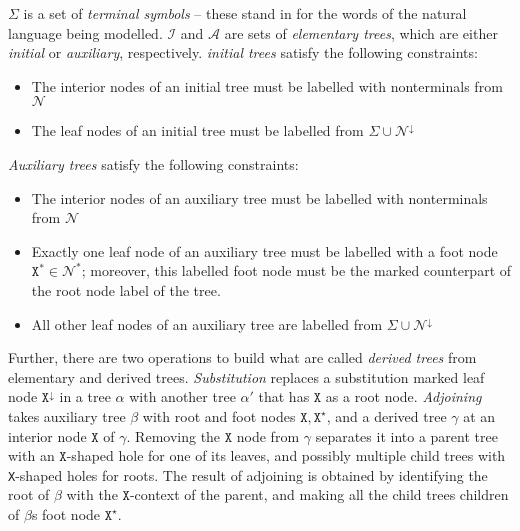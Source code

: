 $\Sigma$ is a set of \emph{terminal symbols} -- these stand in for the words of the natural language being modelled. $\mathcal{I}$ and $\mathcal{A}$ are sets of \emph{elementary trees}, which are either \emph{initial} or \emph{auxiliary}, respectively. \emph{initial trees} satisfy the following constraints:

	\begin{itemize}
		\item{The interior nodes of an initial tree must be labelled with nonterminals from $\mathcal{N}$}
		\item{The leaf nodes of an initial tree must be labelled from $\Sigma \cup \mathcal{N}^{\downarrow}$}
	\end{itemize}
\emph{Auxiliary trees} satisfy the following constraints:
	\begin{itemize}
		\item{The interior nodes of an auxiliary tree must be labelled with nonterminals from $\mathcal{N}$}
		\item{Exactly one leaf node of an auxiliary tree must be labelled with a foot node $\texttt{X}^{*} \in \mathcal{N}^{*}$; moreover, this labelled foot node must be the marked counterpart of the root node label of the tree.}
		\item{All other leaf nodes of an auxiliary tree are labelled from $\Sigma \cup \mathcal{N}^{\downarrow}$}
	\end{itemize}

Further, there are two operations to build what are called \emph{derived trees} from elementary and derived trees. \emph{Substitution} replaces a substitution marked leaf node $\texttt{X}^\downarrow$ in a tree $\alpha$ with another tree $\alpha'$ that has $\texttt{X}$ as a root node. \emph{Adjoining} takes auxiliary tree $\beta$ with root and foot nodes $\texttt{X},\texttt{X}^\star$, and a derived tree $\gamma$ at an interior node $\texttt{X}$ of $\gamma$. Removing the $\texttt{X}$ node from $\gamma$ separates it into a parent tree with an $\texttt{X}$-shaped hole for one of its leaves, and possibly multiple child trees with \texttt{X}-shaped holes for roots. The result of adjoining is obtained by identifying the root of $\beta$ with the $\texttt{X}$-context of the parent, and making all the child trees children of $\beta$s foot node $\texttt{X}^\star$.

\newpage


